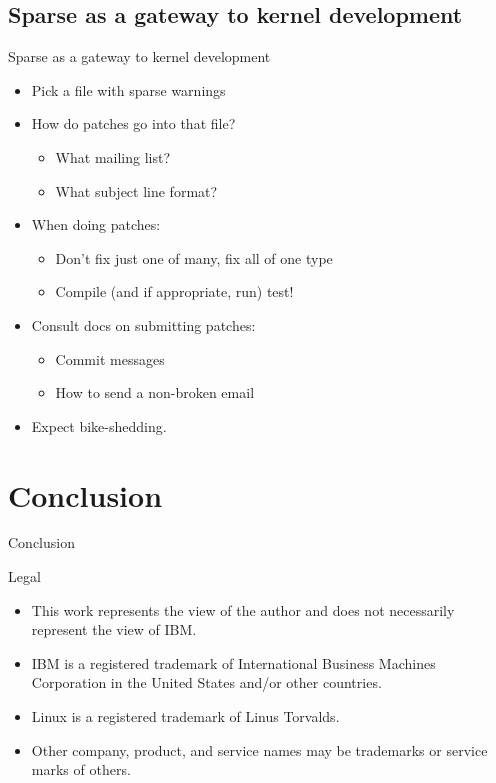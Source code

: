\documentclass[pdf,aspectratio=169]{beamer}
\begin{document}
\subsection{Sparse as a gateway to kernel development}
\label{sec-5-1}

\begin{frame}{Sparse as a gateway to kernel development}

\begin{itemize}
\item Pick a file with sparse warnings
\item How do patches go into that file?
  \begin{itemize}
  \item What mailing list?
  \item What subject line format?
  \end{itemize}
\item When doing patches:
\begin{itemize}
\item Don't fix just one of many, fix all of one type
\item Compile (and if appropriate, run) test!
\end{itemize}
\item Consult docs on submitting patches:
  \begin{itemize}
  \item Commit messages
  \item How to send a non-broken email
  \end{itemize}
\item Expect bike-shedding.
\end{itemize}

\end{frame}

\section{Conclusion}
\label{sec-6}

\begin{frame}{Conclusion}
\tableofcontents
\end{frame}

\begin{frame}{Legal}
  \begin{itemize}
  \item This work represents the view of the author and does not necessarily represent the view of IBM.
  \item IBM is a registered trademark of International Business Machines Corporation in the United States and/or other countries.
  \item Linux is a registered trademark of Linus Torvalds.
  \item Other company, product, and service names may be trademarks or service marks of others.
  \end{itemize}
\end{frame}
\end{document}
